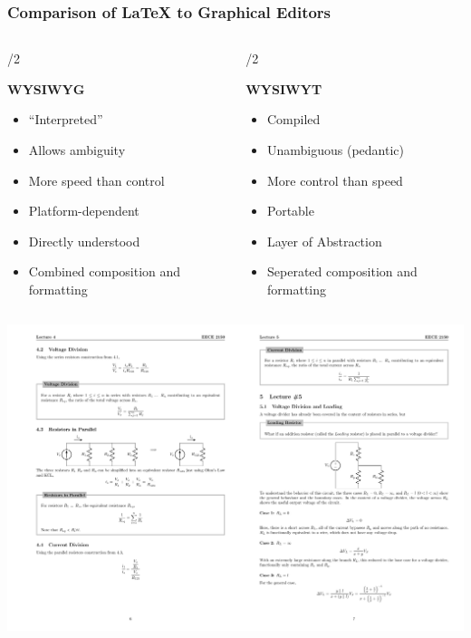 \documentclass{beamer} \usetheme{Madrid}
\begin{document}
\begin{frame}
    \frametitle{Comparison of {\LaTeX} to Graphical Editors}
    \begin{columns}[t]
        \begin{column}{{\textwidth}/2}
            \begin{center}
                \textbf{WYSIWYG}
            \end{center}
            \begin{itemize}
                \item ``Interpreted''
                \item Allows ambiguity
                \item More speed than control
                \item Platform-dependent
                \item Directly understood
                \item Combined composition and formatting
            \end{itemize}
        \end{column}
        \begin{column}{{\textwidth}/2}
            \begin{center}
                \textbf{WYSIWYT}
            \end{center}
            \begin{itemize}
                \item Compiled
                \item Unambiguous (pedantic)
                \item More control than speed
                \item Portable
                \item Layer of Abstraction
                \item Seperated composition and formatting
            \end{itemize}
        \end{column}
    \end{columns}
\end{frame}

\begin{frame}
    \vfill
    \centering\includegraphics[width=\textwidth]{Notes.png}
    \vfill
\end{frame}
\end{document}
